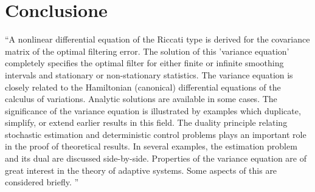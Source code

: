 \documentclass{article}
\begin{document}
\section{Conclusione}
``A nonlinear differential equation of the Riccati type is derived for the covariance matrix of the optimal filtering error. The solution of this 'variance equation' completely specifies the optimal filter for either finite or infinite smoothing intervals and stationary or non-stationary statistics.
The variance equation is closely related to the Hamiltonian (canonical) differential equations of the calculus of variations. Analytic solutions are available in some cases. The significance of the variance equation is illustrated by examples which duplicate, simplify, or extend earlier results in this field.
The duality principle relating stochastic estimation and deterministic control problems plays an important role in the proof of theoretical results. In several examples, the estimation problem and its dual are discussed side-by-side.
Properties of the variance equation are of great interest in the theory of adaptive systems. Some aspects of this are considered briefly. '' \citep{kalmanbucy}



\end{document}
